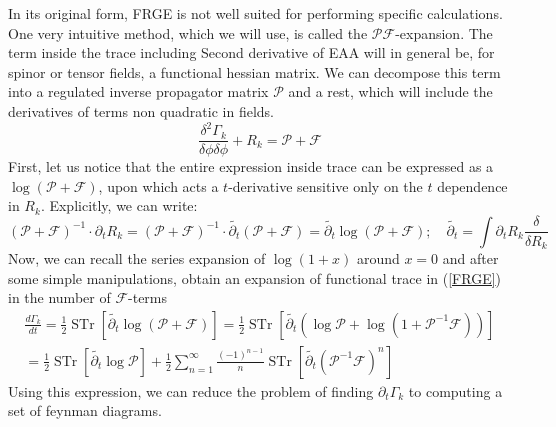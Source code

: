\documentclass[11pt, a4paper]{article}
\begin{document}
In its original form, FRGE is not well suited for performing specific calculations. One very intuitive method, which
we will use, is called the $\mathcal{PF}$-expansion. 
The term inside the trace including Second derivative of EAA
will in general be, for spinor or tensor fields, a functional hessian matrix. We can decompose this term into a
regulated inverse propagator matrix $\mathcal{P}$ and a rest, which will include the derivatives of terms non quadratic in fields.
\begin{equation}
    \frac{\delta^2 \Gamma_k}{\delta \phi \delta \phi} + R_k = \mathcal{P} + \mathcal{F}
    \label{pf1}
\end{equation}
First, let us notice that the entire expression inside trace can be expressed as a $\log{(\mathcal{P}+\mathcal{F})}$, upon which acts
a $t$-derivative sensitive only on the $t$ dependence in $R_k$. Explicitly, we can write:
\begin{equation}
    \left(\mathcal{P} + \mathcal{F}\right)^{-1} \cdot \partial_t R_k = \left(\mathcal{P} + \mathcal{F}\right)^{-1} \cdot \widetilde{\partial_t} \left(\mathcal{P}+\mathcal{F}\right) = \widetilde{\partial_t} \log{\left(\mathcal{P}+\mathcal{F}\right)}; \quad \widetilde{\partial_t} = \int \partial_t R_k \frac{\delta}{\delta R_k}
\end{equation}
Now, we can recall the series expansion of $\log{(1+x)}$ around $x=0$ and after some simple manipulations, obtain an expansion of functional trace in (\ref{FRGE}) in
the number of $\mathcal{F}$-terms
\begin{gather}
    \frac{d \Gamma_k}{dt} = \frac{1}{2} \operatorname{STr} \left[ \widetilde{\partial_t} \log{\left(\mathcal{P}+\mathcal{F}\right)} \right] = \frac{1}{2} \operatorname{STr} \left[ \widetilde{\partial_t} \left(\log{\mathcal{P}} + \log{(1+\mathcal{P}^{-1}\mathcal{F})}\right) \right] \\ =  \frac{1}{2} \operatorname{STr} \left[ \widetilde{\partial_t} \log{\mathcal{P}} \right] + \frac{1}{2} \sum_{n=1}^{\infty} \frac{(-1)^{n-1}}{n} \operatorname{STr}\left[\widetilde{\partial_t}\left(\mathcal{P}^{-1}\mathcal{F}\right)^n\right]
    \label{pf}
\end{gather}
Using this expression, we can reduce the problem of finding $\partial_t \Gamma_k$ to computing a set of feynman diagrams.
\end{document}
